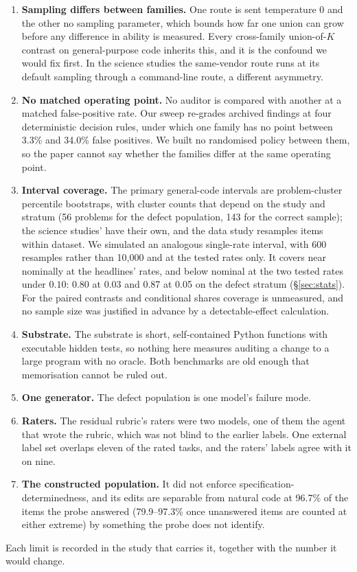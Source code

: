 \begin{enumerate}\itemsep1pt
\item \textbf{Sampling differs between families.} One route is sent temperature $0$ and the other
  no sampling parameter, which bounds how far one union can grow before any difference in ability
  is measured. Every cross-family union-of-$K$ contrast on general-purpose code inherits this,
  and it is the confound we would fix first. In the science studies the same-vendor route runs at
  its default sampling through a command-line route, a different asymmetry.
\item \textbf{No matched operating point.} No auditor is compared with another at a matched
  false-positive rate. Our sweep re-grades archived findings at four deterministic decision
  rules, under which one family has no point between 3.3\% and 34.0\% false positives. We built
  no randomised policy between them, so the paper cannot say whether the families differ at the
  same operating point.
\item \textbf{Interval coverage.} The primary general-code intervals are problem-cluster
  percentile bootstraps, with cluster counts that depend on the study and stratum (56 problems for the
  defect population, 143 for the correct sample); the science studies' have their own, and the data
  study resamples items within dataset. We simulated an analogous single-rate interval, with 600
  resamples rather than 10{,}000 and at the tested rates only. It covers near nominally at the
  headlines' rates, and below nominal at the two tested rates under $0.10$: 0.80 at 0.03 and 0.87 at 0.05 on the defect stratum
  (\S\ref{sec:stats}). For the paired contrasts and
  conditional shares coverage is unmeasured, and no sample size was justified in advance by a
  detectable-effect calculation.
\item \textbf{Substrate.} The substrate is short, self-contained Python functions with executable
  hidden tests, so nothing here measures auditing a change to a large program with no oracle.
  Both benchmarks are old enough that memorisation cannot be ruled out.
\item \textbf{One generator.} The defect population is one model's failure mode.
\item \textbf{Raters.} The residual rubric's raters were two models, one of them the agent that
  wrote the rubric, which was not blind to the earlier labels. One external label set overlaps eleven of
  the rated tasks, and the raters' labels agree with it on nine.
\item \textbf{The constructed population.} It did not enforce specification-determinedness, and
  its edits are separable from natural code at 96.7\% of the items the probe answered
  (79.9--97.3\% once unanswered items are counted at either extreme) by something the probe does
  not identify.
\end{enumerate}
Each limit is recorded in the study that carries it, together with the number it would change.

